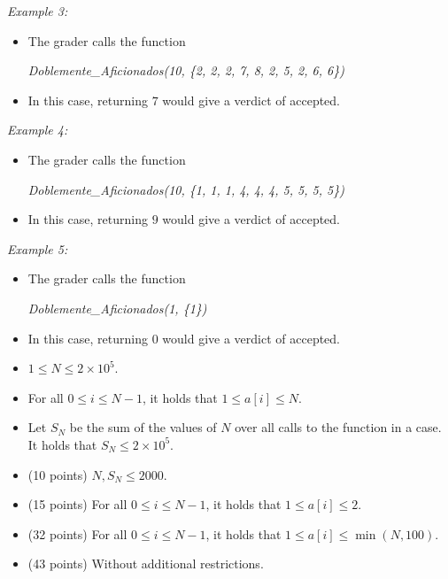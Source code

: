 \documentclass[12pt]{scrartcl}
\begin{document}
        {\itshape Example 3:}
        \begin{itemize}
            \item The grader calls the function 
            
            \begin{center}
                {\itshape Doblemente\_Aficionados(10, \{2, 2, 2, 7, 8, 2, 5, 2, 6, 6\})}
            \end{center}

            \item In this case, returning $7$ would give a verdict of accepted.
        \end{itemize}

        {\itshape Example 4:}
        \begin{itemize}
            \item The grader calls the function 

            \begin{center}
                {\itshape Doblemente\_Aficionados(10, \{1, 1, 1, 4, 4, 4, 5, 5, 5, 5\})}
            \end{center}

            \item In this case, returning $9$ would give a verdict of accepted.
        \end{itemize}
        
        {\itshape Example 5:}
        \begin{itemize}
            \item The grader calls the function 

            \begin{center}
                {\itshape Doblemente\_Aficionados(1, \{1\})}
            \end{center}

            \item In this case, returning $0$ would give a verdict of accepted.
        \end{itemize}
        
        \begin{itemize}
            \item $1 \le N \le 2 \times 10^5$.
            \item For all $0 \le i \le N - 1$, it holds that $1 \le a[i] \le N$.
            \item Let $S_N$ be the sum of the values of $N$ over all calls to the function in a case. It holds that $S_N \le 2\times10^5$.
        \end{itemize}
    

    \begin{itemize}
        \item (10 points) $N, S_N \le 2000$.
        \item (15 points) For all $0 \le i \le N - 1$, it holds that $1 \le a[i] \le 2$.
        \item (32 points) For all $0 \le i \le N - 1$, it holds that $1 \le a[i] \le \min(N, 100)$.
        \item (43 points) Without additional restrictions.
    \end{itemize}
\end{document}
